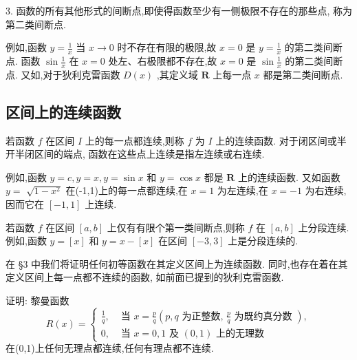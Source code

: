 3. 函数的所有其他形式的间断点,即使得函数至少有一侧极限不存在的那些点, 称为第二类间断点.

例如,函数 \(y = \frac{1}{x}\) 当 \(x \rightarrow  0\) 时不存在有限的极限,故 \(x = 0\) 是 \(y = \frac{1}{x}\) 的第二类间断点. 函数 \(\sin \frac{1}{x}\) 在 \(x = 0\) 处左、右极限都不存在,故 \(x = 0\) 是 \(\sin \frac{1}{x}\) 的第二类间断点. 又如,对于狄利克雷函数 \(D\left( x\right)\) ,其定义域 \(\mathbf{R}\) 上每一点 \(x\) 都是第二类间断点.



\subsection{区间上的连续函数}

若函数 \(f\) 在区间 \(I\) 上的每一点都连续,则称 \(f\) 为 \(I\) 上的连续函数. 对于闭区间或半开半闭区间的端点, 函数在这些点上连续是指左连续或右连续.

例如,函数 \(y = c,y = x,y = \sin x\) 和 \(y = \cos x\) 都是 \(\mathbf{R}\) 上的连续函数. 又如函数 \(y =\)  \(\sqrt{1 - {x}^{2}}\) 在(-1,1)上的每一点都连续,在 \(x = 1\) 为左连续,在 \(x =  - 1\) 为右连续,因而它在 \(\left\lbrack  {-1,1}\right\rbrack\) 上连续.

若函数 \(f\) 在区间 \(\left\lbrack  {a,b}\right\rbrack\) 上仅有有限个第一类间断点,则称 \(f\) 在 \(\left\lbrack  {a,b}\right\rbrack\) 上分段连续. 例如,函数 \(y = \left\lbrack  x\right\rbrack\) 和 \(y = x - \left\lbrack  x\right\rbrack\) 在区间 \(\left\lbrack  {-3,3}\right\rbrack\) 上是分段连续的.

在 §3 中我们将证明任何初等函数在其定义区间上为连续函数. 同时,也存在着在其定义区间上每一点都不连续的函数, 如前面已提到的狄利克雷函数.

\begin{example}
证明: 黎曼函数
\[
R\left( x\right)  = \left\{  \begin{array}{ll} \frac{1}{q}, & \text{ 当 }x = \frac{p}{q}\left( {p,q\text{ 为正整数, }\frac{p}{q}\text{ 为既约真分数 }}\right) , \\  0, & \text{ 当 }x = 0,1\text{ 及 }\left( {0,1}\right) \text{ 上的无理数 } \end{array}\right.
\]
在(0,1)上任何无理点都连续,任何有理点都不连续.
\end{example}


